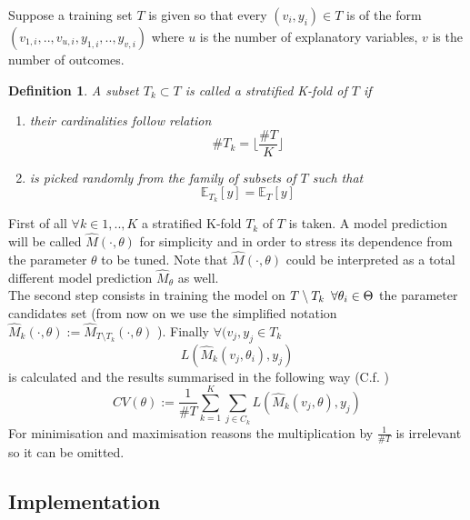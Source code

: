 \documentclass[a4paper,12pt]{article}
\newtheorem{definition}{Definition}[section]
\begin{document}
Suppose a training set $T$ is given so that every $(v_{i}, y_{i}) \in T$ is of the form $(v_{1,i}, .., v_{u,i}, y_{1,i}, .., y_{v,i})$ where $u$ is the number of explanatory variables, $v$ is the number of outcomes.

\begin{definition}
A subset $T_{k} \subset T$ is called a stratified K-fold of $T$ if 
\begin{enumerate}
\item their cardinalities follow relation $$ \# T_{k} = \Big\lfloor \frac{\#T}{K} \Big\rfloor $$
\item is picked randomly from the family of subsets of $T$ such that $$ \mathbb{E}_{T_{k}} [y] = \mathbb{E}_{T} [y]$$
\end{enumerate}
\end{definition}

First of all $\forall k \in 1, ..,K$ a stratified K-fold $T_{k}$ of $T$ is taken. A model prediction will be called $ \hat{M}(\cdot,\theta)$ for simplicity and in order to stress its dependence from the parameter $\theta$ to be tuned.
Note that $\hat{M}(\cdot,\theta)$ could be interpreted as a total different model prediction $\hat{M}_{\theta}$ as well.\\
The second step consists in training the model on $T \setminus T_{k} \enskip \forall \theta_{i} \in \Theta $ the parameter candidates set (from now on we use the simplified notation $ \hat{M}_{k}(\cdot,\theta):=\hat{M}_{T \setminus T_{k}}(\cdot,\theta)$ ).
Finally $\forall (v_{j},y_{j} \in T_{k} $  $$ L(\hat{M}_{k}(v_{j},\theta_{i}),y_{j})$$ is calculated and the results summarised in the following way (C.f. \cite{tibshirani2009} ) $$ CV(\theta):= \frac{1}{\#T} \sum_{k=1}^{K} \sum_{j \in C_{k}} L(\hat{M}_{k}(v_{j},\theta),y_{j})$$
For minimisation and maximisation reasons the multiplication by $\frac{1}{\# T}$ is irrelevant so it can be omitted.

\subsection{Implementation}
\end{document}
